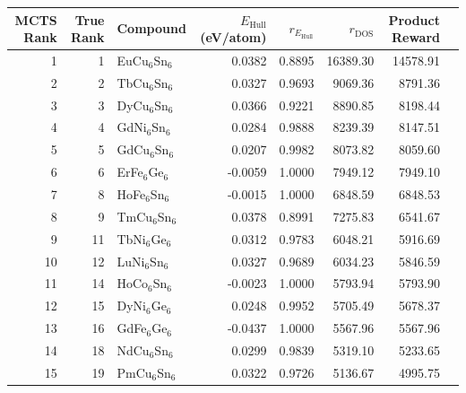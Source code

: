 \begin{tabular}{rrlrrrrr}
\toprule
MCTS Rank & True Rank & Compound & $E_{\mathrm{Hull}}$ (eV/atom) & $r_{E_{\mathrm{Hull}}}$ & $r_{\mathrm{DOS}}$ & Product Reward \\
\midrule
1 & 1 & EuCu$_{6}$Sn$_{6}$ & 0.0382 & 0.8895 & 16389.30 & 14578.91 \\
2 & 2 & TbCu$_{6}$Sn$_{6}$ & 0.0327 & 0.9693 & 9069.36 & 8791.36 \\
3 & 3 & DyCu$_{6}$Sn$_{6}$ & 0.0366 & 0.9221 & 8890.85 & 8198.44 \\
4 & 4 & GdNi$_{6}$Sn$_{6}$ & 0.0284 & 0.9888 & 8239.39 & 8147.51 \\
5 & 5 & GdCu$_{6}$Sn$_{6}$ & 0.0207 & 0.9982 & 8073.82 & 8059.60 \\
6 & 6 & ErFe$_{6}$Ge$_{6}$ & -0.0059 & 1.0000 & 7949.12 & 7949.10 \\
7 & 8 & HoFe$_{6}$Sn$_{6}$ & -0.0015 & 1.0000 & 6848.59 & 6848.53 \\
8 & 9 & TmCu$_{6}$Sn$_{6}$ & 0.0378 & 0.8991 & 7275.83 & 6541.67 \\
9 & 11 & TbNi$_{6}$Ge$_{6}$ & 0.0312 & 0.9783 & 6048.21 & 5916.69 \\
10 & 12 & LuNi$_{6}$Sn$_{6}$ & 0.0327 & 0.9689 & 6034.23 & 5846.59 \\
11 & 14 & HoCo$_{6}$Sn$_{6}$ & -0.0023 & 1.0000 & 5793.94 & 5793.90 \\
12 & 15 & DyNi$_{6}$Ge$_{6}$ & 0.0248 & 0.9952 & 5705.49 & 5678.37 \\
13 & 16 & GdFe$_{6}$Ge$_{6}$ & -0.0437 & 1.0000 & 5567.96 & 5567.96 \\
14 & 18 & NdCu$_{6}$Sn$_{6}$ & 0.0299 & 0.9839 & 5319.10 & 5233.65 \\
15 & 19 & PmCu$_{6}$Sn$_{6}$ & 0.0322 & 0.9726 & 5136.67 & 4995.75 \\
\bottomrule
\end{tabular}
